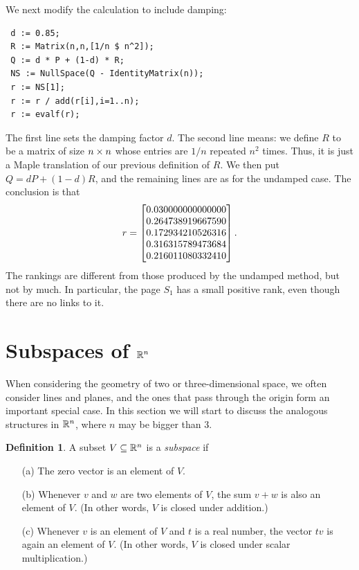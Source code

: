 \documentclass[reqno]{amsart}
\theoremstyle{definition}
\newtheorem{definition}[theorem]{Definition}
\newcommand{\dfn}[1]{\emph{{#1}}\index{#1}}
\begin{document}
We next modify the calculation to include damping:
\begin{verbatim}
 d := 0.85;
 R := Matrix(n,n,[1/n $ n^2]);
 Q := d * P + (1-d) * R;
 NS := NullSpace(Q - IdentityMatrix(n));
 r := NS[1];
 r := r / add(r[i],i=1..n);
 r := evalf(r); 
\end{verbatim}
The first line sets the damping factor $d$.  The second line means: we
define $R$ to be a matrix of size $n\times n$ whose entries are $1/n$
repeated $n^2$ times.  Thus, it is just a Maple translation of our
previous definition of $R$.  We then put $Q=dP+(1-d)R$, and the
remaining lines are as for the undamped case.  The conclusion is that 
\[ r = \left[\begin{matrix}
        0.030000000000000 \\
        0.264738919667590 \\
        0.172934210526316 \\
        0.316315789473684 \\
        0.216011080332410 
       \end{matrix}\right].
\]
The rankings are different from those produced by the undamped method,
but not by much.  In particular, the page $S_1$ has a small positive
rank, even though there are no links to it. 

\section{Subspaces of ${\mathbb{R}}^n$}

When considering the geometry of two or three-dimensional space, we
often consider lines and planes, and the ones that pass through the
origin form an important special case.  In this section we will start
to discuss the analogous structures in ${\mathbb{R}}^n$, where $n$ may be bigger
than $3$.

\begin{definition}\label{defn-subspace}
 A subset $V\subseteq{\mathbb{R}}^n$ is a \dfn{subspace} if
 \begin{itemize}
  \item[(a)] The zero vector is an element of $V$.
  \item[(b)] Whenever $v$ and $w$ are two elements of $V$, the sum
   $v+w$ is also an element of $V$.  (In other words, $V$ is closed
   under addition.)
  \item[(c)] Whenever $v$ is an element of $V$ and $t$ is a real
   number, the vector $tv$ is again an element of $V$.  (In other
   words, $V$ is closed under scalar multiplication.)
 \end{itemize}
\end{definition}
\end{document}
